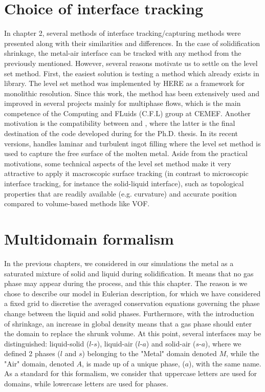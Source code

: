 \section{Choice of interface tracking}
In chapter 2, several methods of interface tracking/capturing methods were presented 
along with their similarities and differences. In the case of solidification shrinkage,
the metal-air interface can be tracked with any method from the previously mentioned.
However, several reasons motivate us to settle on the level set method. 
First, the easiest solution is testing a method which already exists in \cimlib library.
The level set method was implemented by HERE as a framework for monolithic resolution. Since this work,
the method has been extensively used and improved in several projects mainly for multiphase flows, which is the 
main competence of the Computing and FLuids (C.F.L) group at CEMEF. Another motivation is the compatibility
between \cimlib and \thercast, where the latter is the final destination of the code developed during for the Ph.D. thesis.
In its recent versions, \thercast handles laminar and turbulent ingot filling where the level set method is used 
to capture the free surface of the molten metal. Aside from the practical motivations, some technical aspects of the level
set method make it very attractive to apply it macroscopic surface tracking (in contrast to microscopic interface tracking, 
for instance the solid-liquid interface), such as topological properties that are readily available (e.g. curvature)
and accurate position compared to volume-based methods like VOF.
%
\section{Multidomain formalism}
In the previous chapters, we considered in our simulations the metal as a 
saturated mixture of solid and liquid during solidification.
It means that no gas phase may appear during the process, and this  this chapter.
The reason is we chose to describe our model in Eulerian description, 
for which we have considered a fixed grid to discretise the averaged conservation 
equations governing the phase change between the liquid and solid phases.
Furthermore, with the introduction of shrinkage, an increase in global density means 
that a gas phase should enter the domain to replace the shrunk volume.
At this point, several interfaces may be distinguished: liquid-solid ($l$-$s$), liquid-air ($l$-$a$) and solid-air ($s$-$a$), where 
we defined 2 phases ($l$ and $s$) belonging to the "Metal" domain denoted $M$, while the "Air" domain, denoted $A$, 
is made up of a unique phase, ($a$), with the same name. As a standard for this formalism, we consider that uppercase letters
are used for domains, while lowercase letters are used for phases.

